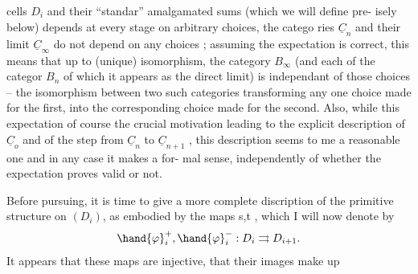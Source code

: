 cells $D_i$ and their ``standar'' amalgamated sums (which we will define pre-%
isely below) depends at every stage on arbitrary choices, the catego\hand{-}%
ries $\underline{C}_n$ and their limit $\underline{C}_\infty$ do not depend on any  choices ; assuming
the expectation is correct, this means that up to (unique) isomorphism,
the category $B_\infty$ (and each of the categor $B_n$ of which it appears as
the direct limit) is independant of those choices -- the isomorphism
between two such categories transforming any one choice made for the
first, into the corresponding choice made for the second. Also, while
this expectation  of course the crucial motivation leading to the
explicit description of $\underline{C}_o$ and of the  step from $\underline{C}_n$ to $\underline{C}_{n+1}$ , this
description seems to me a reasonable one and in any case it makes a for-%
mal sense,  independently of whether the expectation proves valid or not.

 Before pursuing, it is time to give a more complete discription
of the primitive structure on $(D_i)$, as embodied by the maps s,t ,
which I will now denote by
\[ \hand{\varphi}_i^{+} , \hand{\varphi}_i^{-} : D_i \rightrightarrows D_{i+1} . \]
It appears that these maps are injective, that their images make up

